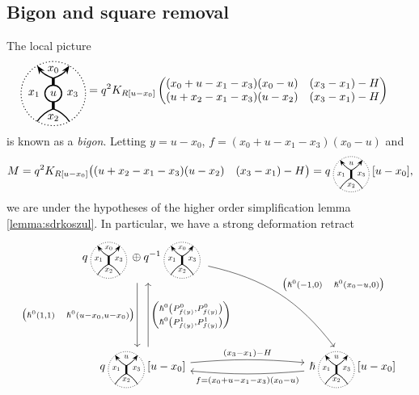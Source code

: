 \documentclass{article}
\newcommand{\kmf}[2]{
	K_{#1}{\begin{pmatrix}
			#2
		\end{pmatrix}
	}	
}
\theoremstyle{plain} %
\theoremstyle{definition} %
\theoremstyle{remark} %
\begin{document}
\subsection{Bigon and square removal}
The local picture
\begin{align*}
	\BigonStandard{u} &= q^2K_{R[u-x_0]}
	\begin{pmatrix}
		(x_0+u-x_1-x_3)(x_0-u) & (x_3-x_1)-H\\
		(u+x_2-x_1-x_3)(u-x_2) & (x_3-x_1)-H
	\end{pmatrix}
\end{align*}
is known as a \emph{bigon}. Letting $y=u-x_0$, $f=(x_0+u-x_1-x_3)(x_0-u)$ and 
$$
M
=
q^2\kmf{R[u-x_0]}{(u+x_2-x_1-x_3)(u-x_2) & (x_3-x_1)-H}
=
q\scalebox{0.7}{\ThickEdge{u}{x_1}{x_2}{x_3}}[u-x_0] 
,
$$ 
we are under the hypotheses of the higher order simplification lemma \ref{lemma:sdrkoszul}. In particular, we have a strong deformation retract
\[
\begin{tikzcd}[column sep=3cm, row sep=2cm]
	q \scalebox{0.7}{\ThickEdgeStandard}\oplus q^{-1} \scalebox{0.7}{\ThickEdgeStandard} 
	\arrow[d, shift right=2, "{\begin{pmatrix} \hslash^0(1,1) \quad \hslash^0(u-x_0,u-x_0)\end{pmatrix}}", swap] 
	\arrow[dr, bend left=20, "{\begin{pmatrix} \hslash^0(-1,0) \quad \hslash^0(x_0-u,0)\end{pmatrix}}"] 
	&
	\\   
	q \scalebox{0.7}{\ThickEdge{u}{x_1}{x_2}{x_3}}[u-x_0] 
	\arrow[u, shift right=2, "{\begin{pmatrix} \hslash^0\left (P^0_{f(y)}, P^0_{f(y)}\right)
			\\    
			\hslash^0\left(P^1_{f(y)}, P^1_{f(y)}\right)
	\end{pmatrix}}"
	, swap]
	\arrow[r, "(x_3-x_1)-H", bend left=5]
	& 
	\hslash \scalebox{0.7}{\ThickEdge{u}{x_1}{x_2}{x_3}}[u-x_0] 
	\arrow[l, "f=(x_0+u-x_1-x_3)(x_0-u)", bend left=5]
\end{tikzcd}
\]
\end{document}
